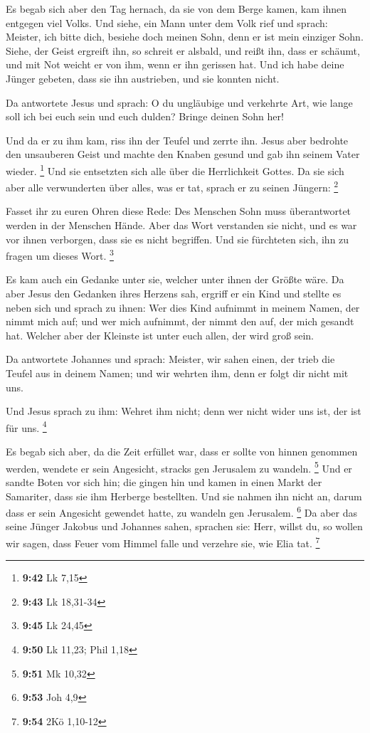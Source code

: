  Es begab sich aber den Tag hernach, da sie von dem Berge
kamen, kam ihnen entgegen viel Volks.  Und siehe, ein
Mann unter dem Volk rief und sprach: Meister, ich bitte dich, besiehe
doch meinen Sohn, denn er ist mein einziger Sohn.  Siehe,
der Geist ergreift ihn, so schreit er alsbald, und reißt ihn, dass er
schäumt, und mit Not weicht er von ihm, wenn er ihn gerissen hat.
 Und ich habe deine Jünger gebeten, dass sie ihn
austrieben, und sie konnten nicht.

 Da antwortete Jesus und sprach: O du ungläubige und
verkehrte Art, wie lange soll ich bei euch sein und euch dulden? Bringe
deinen Sohn her!

 Und da er zu ihm kam, riss ihn der Teufel und zerrte
ihn. Jesus aber bedrohte den unsauberen Geist und machte den Knaben
gesund und gab ihn seinem Vater wieder. \footnote{\textbf{9:42} Lk 7,15}
 Und sie entsetzten sich alle über die Herrlichkeit
Gottes. Da sie sich aber alle verwunderten über alles, was er tat,
sprach er zu seinen Jüngern: \footnote{\textbf{9:43} Lk 18,31-34}

 Fasset ihr zu euren Ohren diese Rede: Des Menschen Sohn
muss überantwortet werden in der Menschen Hände.  Aber
das Wort verstanden sie nicht, und es war vor ihnen verborgen, dass sie
es nicht begriffen. Und sie fürchteten sich, ihn zu fragen um dieses
Wort. \footnote{\textbf{9:45} Lk 24,45}

 Es kam auch ein Gedanke unter sie, welcher unter ihnen
der Größte wäre.  Da aber Jesus den Gedanken ihres
Herzens sah, ergriff er ein Kind und stellte es neben sich
 und sprach zu ihnen: Wer dies Kind aufnimmt in meinem
Namen, der nimmt mich auf; und wer mich aufnimmt, der nimmt den auf, der
mich gesandt hat. Welcher aber der Kleinste ist unter euch allen, der
wird groß sein.

 Da antwortete Johannes und sprach: Meister, wir sahen
einen, der trieb die Teufel aus in deinem Namen; und wir wehrten ihm,
denn er folgt dir nicht mit uns.

 Und Jesus sprach zu ihm: Wehret ihm nicht; denn wer
nicht wider uns ist, der ist für uns. \footnote{\textbf{9:50} Lk 11,23;
  Phil 1,18}

 Es begab sich aber, da die Zeit erfüllet war, dass er
sollte von hinnen genommen werden, wendete er sein Angesicht, stracks
gen Jerusalem zu wandeln. \footnote{\textbf{9:51} Mk 10,32}
 Und er sandte Boten vor sich hin; die gingen hin und
kamen in einen Markt der Samariter, dass sie ihm Herberge bestellten.
 Und sie nahmen ihn nicht an, darum dass er sein
Angesicht gewendet hatte, zu wandeln gen Jerusalem. \footnote{\textbf{9:53}
  Joh 4,9}  Da aber das seine Jünger Jakobus und Johannes
sahen, sprachen sie: Herr, willst du, so wollen wir sagen, dass Feuer
vom Himmel falle und verzehre sie, wie Elia tat. \footnote{\textbf{9:54}
  2Kö 1,10-12}

